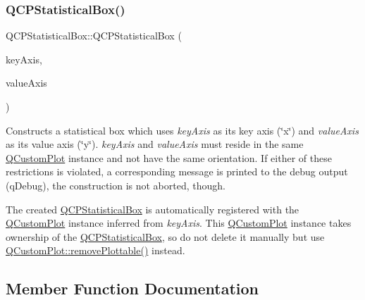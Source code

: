 \subsubsection{\texorpdfstring{Q\+C\+P\+Statistical\+Box()}{QCPStatisticalBox()}}
{\footnotesize\ttfamily Q\+C\+P\+Statistical\+Box\+::\+Q\+C\+P\+Statistical\+Box (\begin{DoxyParamCaption}\item[{\hyperlink{class_q_c_p_axis}{Q\+C\+P\+Axis} $\ast$}]{key\+Axis,  }\item[{\hyperlink{class_q_c_p_axis}{Q\+C\+P\+Axis} $\ast$}]{value\+Axis }\end{DoxyParamCaption})\hspace{0.3cm}{\ttfamily [explicit]}}

Constructs a statistical box which uses {\itshape key\+Axis} as its key axis (\char`\"{}x\char`\"{}) and {\itshape value\+Axis} as its value axis (\char`\"{}y\char`\"{}). {\itshape key\+Axis} and {\itshape value\+Axis} must reside in the same \hyperlink{class_q_custom_plot}{Q\+Custom\+Plot} instance and not have the same orientation. If either of these restrictions is violated, a corresponding message is printed to the debug output (q\+Debug), the construction is not aborted, though.

The created \hyperlink{class_q_c_p_statistical_box}{Q\+C\+P\+Statistical\+Box} is automatically registered with the \hyperlink{class_q_custom_plot}{Q\+Custom\+Plot} instance inferred from {\itshape key\+Axis}. This \hyperlink{class_q_custom_plot}{Q\+Custom\+Plot} instance takes ownership of the \hyperlink{class_q_c_p_statistical_box}{Q\+C\+P\+Statistical\+Box}, so do not delete it manually but use \hyperlink{class_q_custom_plot_af3dafd56884208474f311d6226513ab2}{Q\+Custom\+Plot\+::remove\+Plottable()} instead. 

\subsection{Member Function Documentation}
\mbox{\label{class_q_c_p_statistical_box_a9a8739c5b8291db8fd839e892fc8f478}} 
